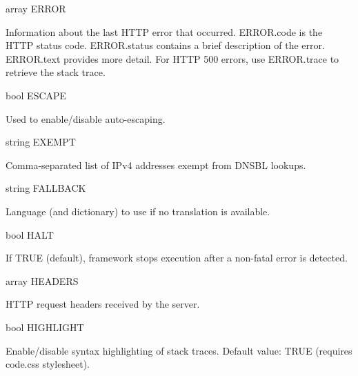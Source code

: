 {\ttfamily array E\+R\+R\+OR}


\begin{DoxyItemize}
\item Information about the last H\+T\+TP error that occurred. {\ttfamily E\+R\+R\+O\+R.\+code} is the H\+T\+TP status code. {\ttfamily E\+R\+R\+O\+R.\+status} contains a brief description of the error. {\ttfamily E\+R\+R\+O\+R.\+text} provides more detail. For H\+T\+TP 500 errors, use {\ttfamily E\+R\+R\+O\+R.\+trace} to retrieve the stack trace.
\end{DoxyItemize}

{\ttfamily bool E\+S\+C\+A\+PE}


\begin{DoxyItemize}
\item Used to enable/disable auto-\/escaping.
\end{DoxyItemize}

{\ttfamily string E\+X\+E\+M\+PT}


\begin{DoxyItemize}
\item Comma-\/separated list of I\+Pv4 addresses exempt from D\+N\+S\+BL lookups.
\end{DoxyItemize}

{\ttfamily string F\+A\+L\+L\+B\+A\+CK}


\begin{DoxyItemize}
\item Language (and dictionary) to use if no translation is available.
\end{DoxyItemize}

{\ttfamily bool H\+A\+LT}


\begin{DoxyItemize}
\item If T\+R\+UE (default), framework stops execution after a non-\/fatal error is detected.
\end{DoxyItemize}

{\ttfamily array H\+E\+A\+D\+E\+RS}


\begin{DoxyItemize}
\item H\+T\+TP request headers received by the server.
\end{DoxyItemize}

{\ttfamily bool H\+I\+G\+H\+L\+I\+G\+HT}


\begin{DoxyItemize}
\item Enable/disable syntax highlighting of stack traces. Default value\+: {\ttfamily T\+R\+UE} (requires {\ttfamily code.\+css} stylesheet).
\end{DoxyItemize}

